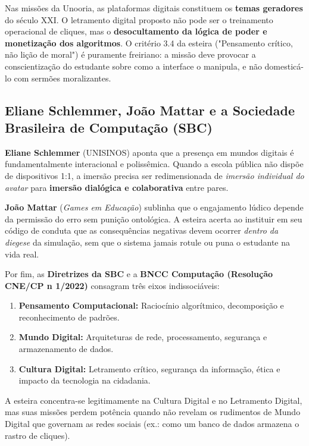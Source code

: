 \documentclass[11pt,a4paper]{article}
\begin{document}
Nas miss\~oes da Unooria, as plataformas digitais constituem os \textbf{temas geradores} do s\'eculo XXI. O letramento digital proposto n\~ao pode ser o treinamento operacional de cliques, mas o \textbf{desocultamento da l\'ogica de poder e monetiza\c{c}\~ao dos algoritmos}. O crit\'erio 3.4 da esteira ("Pensamento cr\'itico, n\~ao li\c{c}\~ao de moral") \'e puramente freiriano: a miss\~ao deve provocar a conscientiza\c{c}\~ao do estudante sobre como a interface o manipula, e n\~ao domestic\'a-lo com serm\~oes moralizantes.

\subsection{Eliane Schlemmer, Jo\~ao Mattar e a Sociedade Brasileira de Computa\c{c}\~ao (SBC)}

\textbf{Eliane Schlemmer} (UNISINOS) aponta que a presen\c{c}a em mundos digitais \'e fundamentalmente interacional e poliss\^emica. Quando a escola p\'ublica n\~ao disp\~oe de dispositivos 1:1, a imers\~ao precisa ser redimensionada de \emph{imers\~ao individual do avatar} para \textbf{imers\~ao dial\'ogica e colaborativa} entre pares.

\textbf{Jo\~ao Mattar} (\emph{Games em Educa\c{c}\~ao}) sublinha que o engajamento l\'udico depende da permiss\~ao do erro sem puni\c{c}\~ao ontol\'ogica. A esteira acerta ao instituir em seu c\'odigo de conduta que as consequ\^encias negativas devem ocorrer \emph{dentro da diegese} da simula\c{c}\~ao, sem que o sistema jamais rotule ou puna o estudante na vida real.

Por fim, as \textbf{Diretrizes da SBC} e a \textbf{BNCC Computa\c{c}\~ao (Resolu\c{c}\~ao CNE/CP n\textordmasculine{} 1/2022)} consagram tr\^es eixos indissoci\'aveis:
\begin{enumerate}
    \item \textbf{Pensamento Computacional:} Racioc\'inio algor\'itmico, decomposi\c{c}\~ao e reconhecimento de padr\~oes.
    \item \textbf{Mundo Digital:} Arquiteturas de rede, processamento, seguran\c{c}a e armazenamento de dados.
    \item \textbf{Cultura Digital:} Letramento cr\'itico, seguran\c{c}a da informa\c{c}\~ao, \'etica e impacto da tecnologia na cidadania.
\end{enumerate}
A esteira concentra-se legitimamente na Cultura Digital e no Letramento Digital, mas suas miss\~oes perdem pot\^encia quando n\~ao revelam os rudimentos de Mundo Digital que governam as redes sociais (ex.: como um banco de dados armazena o rastro de cliques).
\end{document}
